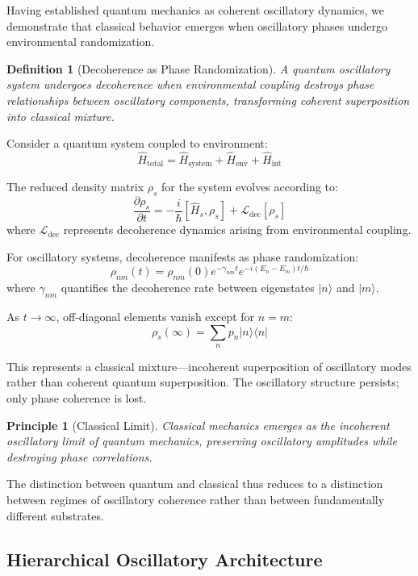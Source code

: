 \documentclass[11pt]{article}
\newtheorem{definition}[theorem]{Definition}
\newtheorem{principle}[theorem]{Principle}
\theoremstyle{remark}
\begin{document}
Having established quantum mechanics as coherent oscillatory dynamics, we demonstrate that classical behavior emerges when oscillatory phases undergo environmental randomization.

\begin{definition}[Decoherence as Phase Randomization]
A quantum oscillatory system undergoes decoherence when environmental coupling destroys phase relationships between oscillatory components, transforming coherent superposition into classical mixture.
\end{definition}

Consider a quantum system coupled to environment:
$$\hat{H}_{\text{total}} = \hat{H}_{\text{system}} + \hat{H}_{\text{env}} + \hat{H}_{\text{int}}$$

The reduced density matrix $\rho_s$ for the system evolves according to:
$$\frac{\partial \rho_s}{\partial t} = -\frac{i}{\hbar}[\hat{H}_s, \rho_s] + \mathcal{L}_{\text{dec}}[\rho_s]$$
where $\mathcal{L}_{\text{dec}}$ represents decoherence dynamics arising from environmental coupling.

For oscillatory systems, decoherence manifests as phase randomization:
$$\rho_{nm}(t) = \rho_{nm}(0) e^{-\gamma_{nm} t} e^{-i(E_n - E_m)t/\hbar}$$
where $\gamma_{nm}$ quantifies the decoherence rate between eigenstates $|n\rangle$ and $|m\rangle$.

As $t \to \infty$, off-diagonal elements vanish except for $n = m$:
$$\rho_s(\infty) = \sum_n p_n |n\rangle\langle n|$$

This represents a classical mixture—incoherent superposition of oscillatory modes rather than coherent quantum superposition. The oscillatory structure persists; only phase coherence is lost.

\begin{principle}[Classical Limit]
Classical mechanics emerges as the incoherent oscillatory limit of quantum mechanics, preserving oscillatory amplitudes while destroying phase correlations.
\end{principle}

The distinction between quantum and classical thus reduces to a distinction between regimes of oscillatory coherence rather than between fundamentally different substrates.

\subsection{Hierarchical Oscillatory Architecture}
\end{document}
